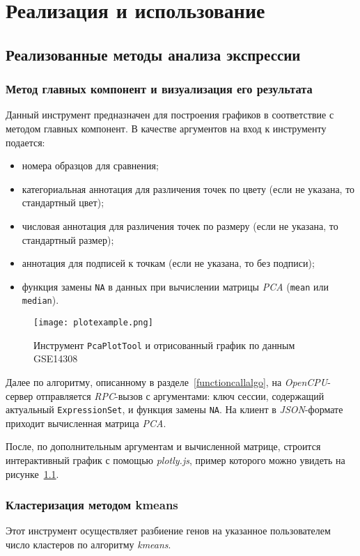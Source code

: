 \chapter{Реализация и использование}\label{implementation}
\section{Реализованные методы анализа экспрессии}
\subsection{Метод главных компонент и визуализация его результата}
Данный инструмент предназначен для построения графиков в соответствие с методом главных компонент.
В качестве аргументов на вход к инструменту подается:
\begin{itemize}
\item номера образцов для сравнения;
\item категориальная аннотация для различения точек по цвету (если не указана, то стандартный цвет);
\item числовая аннотация для различения точек по размеру (если не указана, то стандартный размер);
\item аннотация для подписей к точкам (если не указана, то без подписи);
\item функция замены \texttt{NA} в данных при вычислении матрицы \emph{PCA} (\texttt{mean} или \texttt{median}).
\end{itemize}

\begin{figure}[h]
  \caption{Инструмент \texttt{PcaPlotTool} и отрисованный график по данным GSE14308}
  \texttt{[image: plotexample.png]}
  \label{plotexample}
\end{figure}

Далее по алгоритму, описанному в разделе~\ref{functioncallalgo}, на \emph{OpenCPU}-сервер отправляется \emph{RPC}-вызов с аргументами: ключ сессии, содержащий актуальный \texttt{ExpressionSet}, и функция замены \texttt{NA}. На клиент в \emph{JSON}-формате приходит вычисленная матрица \emph{PCA}.

После, по дополнительным аргументам и вычисленной матрице, строится интерактивный график с помощью \emph{plotly.js}, пример которого можно увидеть на рисунке~\ref{plotexample}.

\subsection{Кластеризация методом kmeans}
Этот инструмент осуществляет разбиение генов на указанное пользователем число кластеров по алгоритму \emph{kmeans}.

